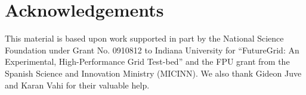 \documentclass[final,5p,times,twocolumn]{elsarticle}
\begin{document}








\section*{Acknowledgements}

This material is based upon work supported in part by the National Science Foundation under Grant No. 0910812 to Indiana University for ``FutureGrid: An Experimental, High-Performance Grid Test-bed'' and the FPU grant from the Spanish Science and Innovation Ministry (MICINN). We also thank Gideon Juve and Karan Vahi for their valuable help.




\end{document}
